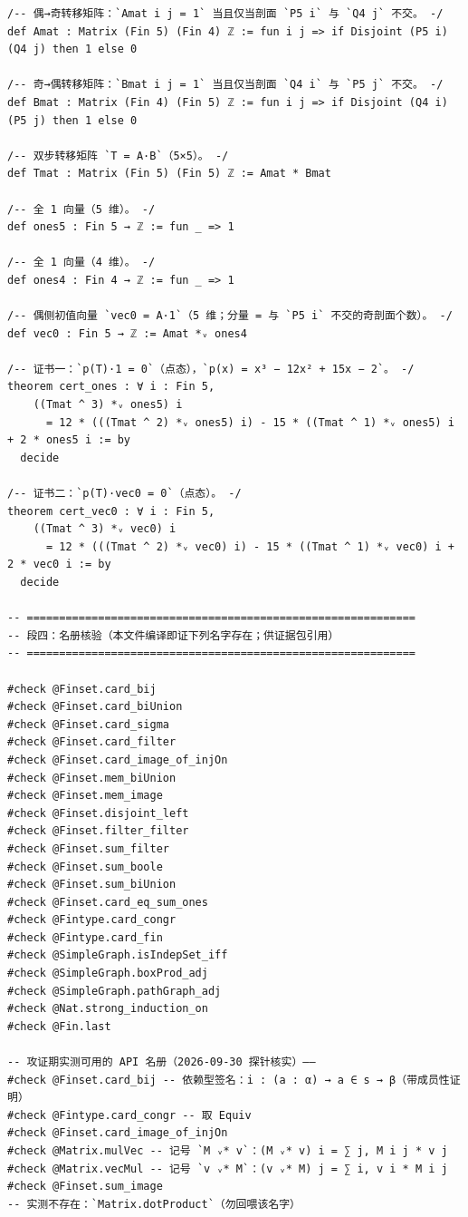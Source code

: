 \documentclass[11pt]{article}
\begin{document}
\begin{lstlisting}
/-- 偶→奇转移矩阵：`Amat i j = 1` 当且仅当剖面 `P5 i` 与 `Q4 j` 不交。 -/
def Amat : Matrix (Fin 5) (Fin 4) ℤ := fun i j => if Disjoint (P5 i) (Q4 j) then 1 else 0

/-- 奇→偶转移矩阵：`Bmat i j = 1` 当且仅当剖面 `Q4 i` 与 `P5 j` 不交。 -/
def Bmat : Matrix (Fin 4) (Fin 5) ℤ := fun i j => if Disjoint (Q4 i) (P5 j) then 1 else 0

/-- 双步转移矩阵 `T = A·B`（5×5）。 -/
def Tmat : Matrix (Fin 5) (Fin 5) ℤ := Amat * Bmat

/-- 全 1 向量（5 维）。 -/
def ones5 : Fin 5 → ℤ := fun _ => 1

/-- 全 1 向量（4 维）。 -/
def ones4 : Fin 4 → ℤ := fun _ => 1

/-- 偶侧初值向量 `vec0 = A·1`（5 维；分量 = 与 `P5 i` 不交的奇剖面个数）。 -/
def vec0 : Fin 5 → ℤ := Amat *ᵥ ones4

/-- 证书一：`p(T)·1 = 0`（点态），`p(x) = x³ − 12x² + 15x − 2`。 -/
theorem cert_ones : ∀ i : Fin 5,
    ((Tmat ^ 3) *ᵥ ones5) i
      = 12 * (((Tmat ^ 2) *ᵥ ones5) i) - 15 * ((Tmat ^ 1) *ᵥ ones5) i + 2 * ones5 i := by
  decide

/-- 证书二：`p(T)·vec0 = 0`（点态）。 -/
theorem cert_vec0 : ∀ i : Fin 5,
    ((Tmat ^ 3) *ᵥ vec0) i
      = 12 * (((Tmat ^ 2) *ᵥ vec0) i) - 15 * ((Tmat ^ 1) *ᵥ vec0) i + 2 * vec0 i := by
  decide

-- ============================================================
-- 段四：名册核验（本文件编译即证下列名字存在；供证据包引用）
-- ============================================================

#check @Finset.card_bij
#check @Finset.card_biUnion
#check @Finset.card_sigma
#check @Finset.card_filter
#check @Finset.card_image_of_injOn
#check @Finset.mem_biUnion
#check @Finset.mem_image
#check @Finset.disjoint_left
#check @Finset.filter_filter
#check @Finset.sum_filter
#check @Finset.sum_boole
#check @Finset.sum_biUnion
#check @Finset.card_eq_sum_ones
#check @Fintype.card_congr
#check @Fintype.card_fin
#check @SimpleGraph.isIndepSet_iff
#check @SimpleGraph.boxProd_adj
#check @SimpleGraph.pathGraph_adj
#check @Nat.strong_induction_on
#check @Fin.last

-- 攻证期实测可用的 API 名册（2026-09-30 探针核实）——
#check @Finset.card_bij -- 依赖型签名：i : (a : α) → a ∈ s → β（带成员性证明）
#check @Fintype.card_congr -- 取 Equiv
#check @Finset.card_image_of_injOn
#check @Matrix.mulVec -- 记号 `M ᵥ* v`：(M ᵥ* v) i = ∑ j, M i j * v j
#check @Matrix.vecMul -- 记号 `v ᵥ* M`：(v ᵥ* M) j = ∑ i, v i * M i j
#check @Finset.sum_image
-- 实测不存在：`Matrix.dotProduct`（勿回喂该名字）


\end{lstlisting}
\end{document}
